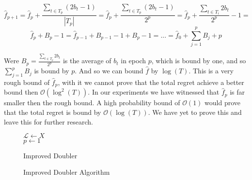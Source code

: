 \documentclass{llncs}
\begin{document}
	$$\hat{f}_{p+1}=\hat{f}_{p} + 
		\frac{\sum\limits_{t\in T_p} (2b_t -1)}{|T_{p}|} = 
		\hat{f}_{p} + 
		\frac{\sum\limits_{t\in T_p} (2b_t -1)}{2^{p}} = 
		\hat{f}_{p} + 
		\frac{\sum\limits_{t\in T_i} 2b_t}{2^{p}}-1 =$$
		$$
		\hat{f}_{p} + B_p -1 =  
		\hat{f}_{p-1} +B_{p-1} -1+ B_p -1 = ... =  
		\hat{f}_{0} + \sum\limits_{j=1}^p B_{j}+p$$
	
	Were $ B_{p} = \frac{\sum\limits_{t\in T_p} 2b_t}{2^{p}}$ is the average of $b_t$ in epoch $p$, which is bound by one, and so 
	$\sum\limits_{j=1}^p B_{j}$ is bound by $p$. And so we can bound $\hat{f}$ by $\log(T)$.
	This is a very rough bound of $\hat{f}_p$, with it we cannot prove that the total regret achieve a better bound then $\mathcal{O}(\log^2(T))$.
	In our experiments we have witnessed that $\hat{f}_p$ is far smaller then the rough bound. A high probability bound of $\mathcal{O}(1)$ would prove that the total regret is bound by $\mathcal{O}(\log(T))$.
	We have yet to prove this and leave this for further research.
	
\begin{figure}[h]
	\IncMargin{1em}
		\begin{algorithm}[H]
		\BlankLine
		$\mathcal{L} \leftarrow X$\\
		$p\leftarrow 1$\\
			\caption{Improved Doubler}
		\end{algorithm}
		\caption{Improved Doubler Algorithm}\label{algo_adv_doubler}
	\end{figure}		
		
\end{document}
